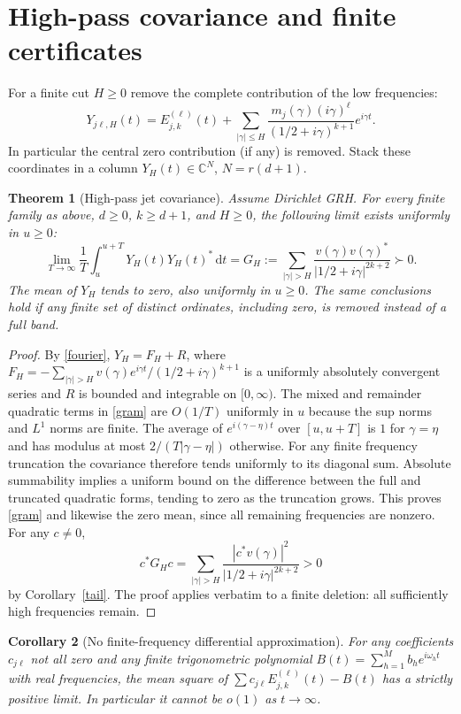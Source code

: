 \documentclass[11pt]{article}
\newtheorem{theorem}{Theorem}
\newtheorem{corollary}[theorem]{Corollary}
\theoremstyle{remark}\newtheorem{remark}[theorem]{Remark}
\newcommand{\C}{\mathbb C}\newcommand{\R}{\mathbb R}\newcommand{\dd}{\mathrm d}\newcommand{\Rea}{\operatorname{Re}}\newcommand{\ord}{\operatorname{ord}}\newcommand{\diag}{\operatorname{diag}}\newcommand{\Span}{\operatorname{span}}
\begin{document}
\section{High-pass covariance and finite certificates}
For a finite cut $H\ge0$ remove the complete contribution of the low frequencies:
\begin{equation}\label{filtered}
 Y_{j\ell,H}(t)=E_{j,k}^{(\ell)}(t)+\sum_{|\gamma|\le H}
 \frac{m_j(\gamma)(i\gamma)^\ell}{(1/2+i\gamma)^{k+1}}e^{i\gamma t}.
\end{equation}
In particular the central zero contribution (if any) is removed. Stack these coordinates in a column $Y_H(t)\in\C^N$, $N=r(d+1)$.
\begin{theorem}[High-pass jet covariance]\label{cov}
Assume Dirichlet GRH. For every finite family as above, $d\ge0$, $k\ge d+1$, and $H\ge0$, the following limit exists uniformly in $u\ge0$:
\begin{equation}\label{gram}
 \lim_{T\to\infty}\frac1T\int_u^{u+T}Y_H(t)Y_H(t)^*\,\dd t
 =G_H:=\sum_{|\gamma|>H}\frac{v(\gamma)v(\gamma)^*}{|1/2+i\gamma|^{2k+2}}\succ0.
\end{equation}
The mean of $Y_H$ tends to zero, also uniformly in $u\ge0$. The same conclusions hold if any finite set of distinct ordinates, including zero, is removed instead of a full band.
\end{theorem}
\begin{proof}
By \eqref{fourier}, $Y_H=F_H+R$, where $F_H=-\sum_{|\gamma|>H}v(\gamma)e^{i\gamma t}/(1/2+i\gamma)^{k+1}$ is a uniformly absolutely convergent series and $R$ is bounded and integrable on $[0,\infty)$. The mixed and remainder quadratic terms in \eqref{gram} are $O(1/T)$ uniformly in $u$ because the sup norms and $L^1$ norms are finite. The average of $e^{i(\gamma-\eta)t}$ over $[u,u+T]$ is $1$ for $\gamma=\eta$ and has modulus at most $2/(T|\gamma-\eta|)$ otherwise. For any finite frequency truncation the covariance therefore tends uniformly to its diagonal sum. Absolute summability implies a uniform bound on the difference between the full and truncated quadratic forms, tending to zero as the truncation grows. This proves \eqref{gram} and likewise the zero mean, since all remaining frequencies are nonzero. For any $c\ne0$,
\[
 c^*G_Hc=\sum_{|\gamma|>H}\frac{|c^*v(\gamma)|^2}{|1/2+i\gamma|^{2k+2}}>0
\]
by Corollary~\ref{tail}. The proof applies verbatim to a finite deletion: all sufficiently high frequencies remain.
\end{proof}
\begin{corollary}[No finite-frequency differential approximation]\label{approx}
For any coefficients $c_{j\ell}$ not all zero and any finite trigonometric polynomial $B(t)=\sum_{h=1}^M b_h e^{i\omega_h t}$ with real frequencies, the mean square of $\sum c_{j\ell}E_{j,k}^{(\ell)}(t)-B(t)$ has a strictly positive limit. In particular it cannot be $o(1)$ as $t\to\infty$.
\end{corollary}
\end{document}
